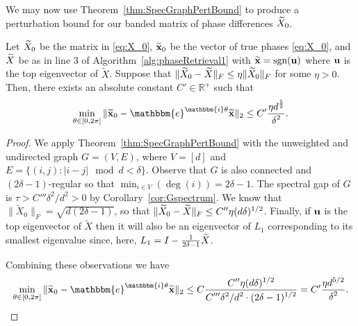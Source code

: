 We may now use Theorem~\ref{thm:SpecGraphPertBound} to produce a perturbation bound for our banded matrix of phase differences $\widetilde{X}_0$.%

\begin{corollary}
Let $\widetilde{X}_0$ be the matrix in \eqref{eq:X_0}, $\widetilde{\mathbf x}_0$ be the vector of true phases \eqref{eq:X_0}, and $\widetilde{X}$ be as in line 3 of Algorithm~\ref{alg:phaseRetrieval1} with $\widetilde{\mathbf x} = \mathrm{sgn}({\bf u})$ where ${\bf u}$ is the top eigenvector of $\widetilde{X}$. Suppose that 
$\Vert \widetilde{X}_0 - \widetilde{X} \Vert_F \le \eta \Vert \widetilde{X}_0 \Vert_F$ for some $\eta>0$.  Then, there exists an absolute constant $C' \in \mathbb{R}^+$ such that
\[\min_{\theta\in[0,2\pi]} \Vert \tx_0 - \mathbbm{e}^{\mathbbm{i}\theta} \tx \Vert_2 \le C' \bigfrac{\eta d^\frac{5}{2}}{\delta^{2}}.\]
\label{cor:GenBoundv2}
\end{corollary}

\begin{proof}
 We apply Theorem~\ref{thm:SpecGraphPertBound} with the unweighted and undirected graph $G = (V, E)$, where $V = [d]$ and $E = \{(i, j) : |i - j| \mod d < \delta\}$.  Observe that $G$ is also connected and $(2\delta - 1)$-regular so that $\min_{i \in V}(\deg(i)) = 2\delta - 1$.  The spectral gap of $G$ is $\tau > C'''\delta^2 / d^2 > 0$ by Corollary~\ref{cor:Gspectrum}.  We know that $\| \widetilde{X}_0 \|_F = \sqrt{d(2\delta - 1)}$, so that $\| \widetilde{X}_0 - \widetilde{X} \|_{F} \le C'' \eta (d \delta)^{1/2}$.  Finally, if ${\bf u}$ is the top eigenvector of $\widetilde{X}$ then it will also be an eigenvector of $L_1$ corresponding to its smallest eigenvalue since, here, $L_1 = I - \frac{1}{2 \delta - 1} \widetilde{X} $.

Combining these observations we have \[\min_{\theta\in[0,2\pi]} \Vert \tx_0 - \mathbbm{e}^{\mathbbm{i}\theta} \tx \Vert_2 \le C \bigfrac{C'' \eta (d \delta)^{1/2}}{C''' \delta^2 / d^2 \cdot (2 \delta - 1)^{1/2}} = C' \bigfrac{\eta d^{5/2}}{\delta^2}.\]
\end{proof}
